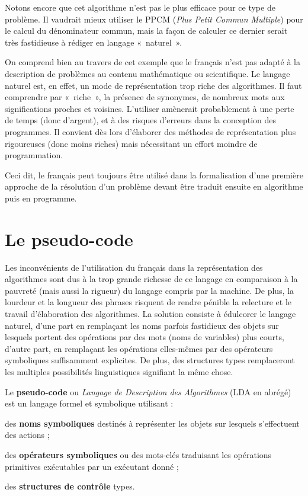 		Notons encore que cet algorithme n’est pas le
		plus efficace pour ce type de problème. 
		Il vaudrait mieux utiliser le PPCM 
		(\textit{Plus Petit Commun Multiple}) 
		pour le calcul du dénominateur commun, mais la façon
		de calculer ce dernier serait très fastidieuse à rédiger en langage
		«~naturel~».

		On comprend bien au travers de cet exemple que
		le français n’est pas adapté à la description de problèmes au contenu
		mathématique ou scientifique. Le langage naturel est, en effet, un mode
		de représentation trop riche des algorithmes. Il faut comprendre par
		«~riche~», la présence de synonymes, de nombreux mots aux
		significations proches et voisines. L’utiliser amènerait probablement à
		une perte de temps (donc d’argent), et à des risques d’erreurs dans la
		conception des programmes. Il convient dès lors d’élaborer des méthodes
		de représentation plus rigoureuses (donc moins riches) mais nécessitant
		un effort moindre de programmation.

		Ceci dit, le français peut toujours être
		utilisé dans la formalisation d’une première approche de la résolution
		d’un problème devant être traduit ensuite en algorithme puis en
		programme.

	\section{Le pseudo-code}
	
		Les inconvénients de l’utilisation du français dans la représentation
		des algorithmes sont dus à la trop grande richesse de ce langage en
		comparaison à la pauvreté (mais aussi la rigueur) du langage compris
		par la machine. De plus, la lourdeur et la longueur des phrases
		risquent de rendre pénible la relecture et le travail d’élaboration des
		algorithmes. La solution consiste à édulcorer le langage naturel, d’une
		part en remplaçant les noms parfois fastidieux des objets sur lesquels
		portent des opérations par des mots (noms de variables) plus courts,
		d’autre part, en remplaçant les opérations elles-mêmes par des
		opérateurs symboliques suffisamment explicites. De plus, des structures
		types remplaceront les multiples possibilités linguistiques signifiant
		la même chose.

		Le \textbf{pseudo-code} ou \textit{Langage de Description des
		Algorithmes} (LDA en abrégé) est un langage formel et symbolique
		utilisant :

		\begin{liste}
		\item
			des \textbf{noms symboliques} destinés à représenter les objets sur
			lesquels s’effectuent des actions ;
		\item
			des \textbf{opérateurs symboliques} ou des mots-clés traduisant les
			opérations primitives exécutables par un exécutant donné ;
		\item
			des \textbf{structures de contrôle} types.
		\end{liste}

